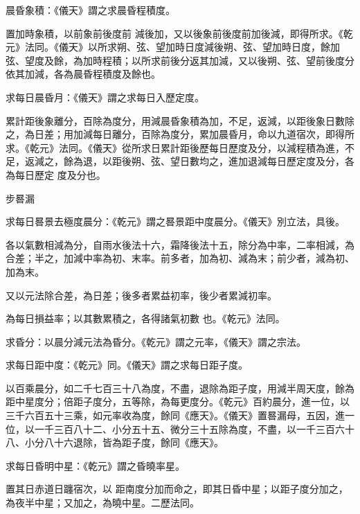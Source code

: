 \begin{pinyinscope}
 晨昏象積：《儀天》謂之求晨昏程積度。



 置加時象積，以前象前後度前
 減後加，又以後象前後度前加後減，即得所求。《乾元》法同。《儀天》以所求朔、弦、望加時日度減後朔、弦、望加時日度，餘加弦、望度及餘，為加時程積；以所求前後分返其加減，又以後朔、弦、望前後度分依其加減，各為晨昏程積度及餘也。



 求每日晨昏月：《儀天》謂之求每日入歷定度。



 累計距後象離分，百除為度分，用減晨昏象積為加，不足，返減，以距後象日數除之，為日差；用加減每日離分，百除為度分，累加晨昏月，命以九道宿次，即得所求。《乾元》法同。《儀天》從所求日累計距後歷每日歷度及分，以減程積為進，不足，返減之，餘為退，以距後朔、弦、望日數均之，進加退減每日歷定度及分，各為每日歷定
 度及分也。



 步晷漏



 求每日晷景去極度晨分：《乾元》謂之晷景距中度晨分。《儀天》別立法，具後。



 各以氣數相減為分，自雨水後法十六，霜降後法十五，除分為中率，二率相減，為合差；半之，加減中率為初、末率。前多者，加為初、減為末；前少者，減為初、加為末。



 又以元法除合差，為日差；後多者累益初率，後少者累減初率。



 為每日損益率；以其數累積之，各得諸氣初數
 也。《乾元》法同。



 求昏分：以晨分減元法為昏分。《乾元》謂之元率，《儀天》謂之宗法。



 求每日距中度：《乾元》同。《儀天》謂之求每日距子度。



 以百乘晨分，如二千七百三十八為度，不盡，退除為距子度，用減半周天度，餘為距中星度分；倍距子度分，五等除，為每更度分。《乾元》百約晨分，進一位，以三千六百五十三乘，如元率收為度，餘同《應天》。《儀天》置晷漏母，五因，進一位，以一千三百八十二、小分五十五、微分三十五除為度，不盡，以一千三百六十八、小分八十六退除，皆為距子度，餘同《應天》。



 求每日昏明中星：《乾元》謂之昏曉率星。



 置其日赤道日躔宿次，以
 距南度分加而命之，即其日昏中星；以距子度分加之，為夜半中星；又加之，為曉中星。二歷法同。




\end{pinyinscope}
